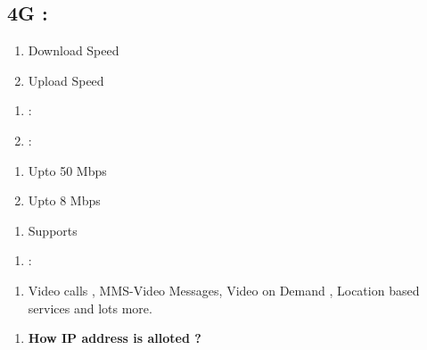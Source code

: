 \documentclass{article}
\newcommand\tab[1][1cm]{\hspace*{#1}}
\begin{document}
\subsection{4G :}
\begin{multicols}{3}
\begin{enumerate}[label= ]
\item \tab Download Speed
\item \tab Upload Speed
\end{enumerate}
\columnbreak
\begin{enumerate}[label= ]
\item :
\item :
\end{enumerate}
\columnbreak
\begin{enumerate}[label= ]
\item Upto 50 Mbps
\item Upto 8 Mbps
\end{enumerate}
\end{multicols}
\begin{multicols}{3}
\begin{enumerate}[label= ]
\item \tab Supports
\end{enumerate}
\columnbreak
\begin{enumerate}[label= ]
\item :
\end{enumerate}
\columnbreak
\begin{enumerate}[label= ]
\item Video calls , MMS-Video Messages, Video on Demand , Location based services and lots more.
\end{enumerate}
\end{multicols}
\pagebreak
\begin{enumerate}[label=\textbf{Question \arabic*.}]
\item \textbf{How IP address is alloted  ?}
\end{enumerate}
\end{document}
